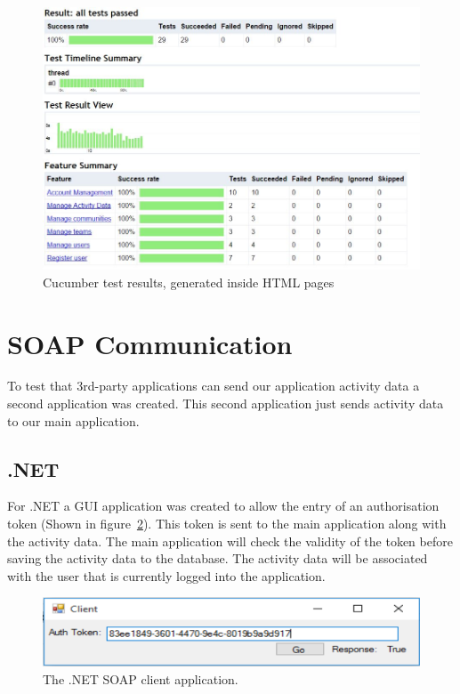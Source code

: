 \begin{figure}[H]
\begin{center}
\includegraphics[scale=0.6]{images/testing/specflowResults.jpg} 
\caption{Cucumber test results, generated inside HTML pages}
\label{fig:testing_html_results}
\end{center}
\end{figure}

\section{SOAP Communication}
To test that 3rd-party applications can send our application activity data a second application was created. This second application just sends activity data to our main application. 

\subsection{.NET}
For .NET a GUI application was created to allow the entry of an authorisation token (Shown in figure~\ref{fig:testing_authTokenNet}). This token is sent to the main application along with the activity data. The main application will check the validity of the token before saving the activity data to the database. The activity data will be associated with the user that is currently logged into the application.

\begin{figure}[H]
\begin{center}
\includegraphics[scale=0.3]{images/testing/clientAuthTokenNET.png} 
\caption{The .NET SOAP client application.}
\label{fig:testing_authTokenNet}
\end{center}
\end{figure}


